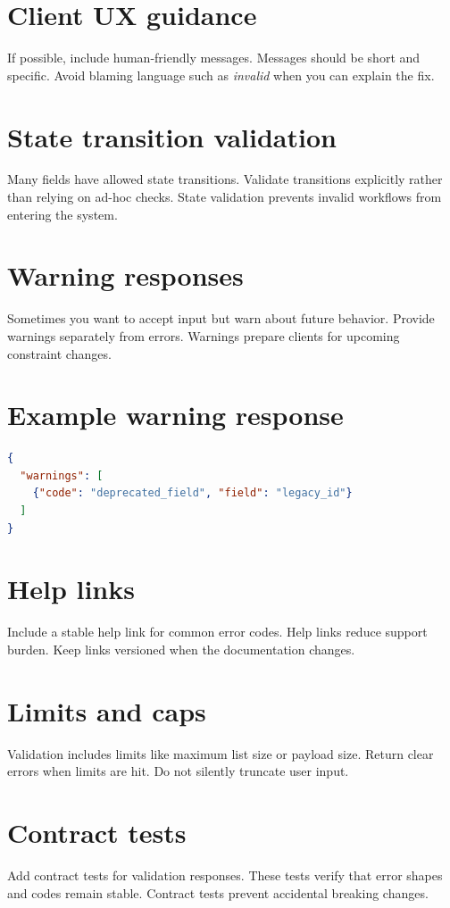 \section{Client UX guidance}
If possible, include human-friendly messages.
Messages should be short and specific.
Avoid blaming language such as \emph{invalid} when you can explain the fix.

\section{State transition validation}
Many fields have allowed state transitions.
Validate transitions explicitly rather than relying on ad-hoc checks.
State validation prevents invalid workflows from entering the system.

\section{Warning responses}
Sometimes you want to accept input but warn about future behavior.
Provide warnings separately from errors.
Warnings prepare clients for upcoming constraint changes.

\section{Example warning response}
\begin{lstlisting}[language=JSON]
{
  "warnings": [
    {"code": "deprecated_field", "field": "legacy_id"}
  ]
}
\end{lstlisting}

\section{Help links}
Include a stable help link for common error codes.
Help links reduce support burden.
Keep links versioned when the documentation changes.

\section{Limits and caps}
Validation includes limits like maximum list size or payload size.
Return clear errors when limits are hit.
Do not silently truncate user input.

\section{Contract tests}
Add contract tests for validation responses.
These tests verify that error shapes and codes remain stable.
Contract tests prevent accidental breaking changes.

